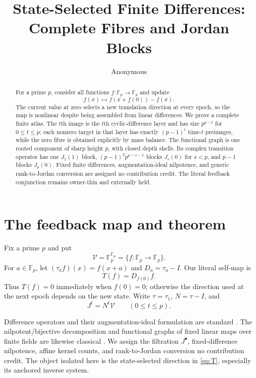 \documentclass[a4paper,10pt]{amsart}
\title[State-selected finite differences]{State-Selected Finite Differences:\\
Complete Fibres and Jordan Blocks}
\author{Anonymous}
\date{}
\theoremstyle{remark}
\newcommand{\F}{\mathbb F}
\newcommand{\cV}{\mathcal V}
\begin{document}
\begin{abstract}
For a prime $p$, consider all functions $f:\F_p\to\F_p$ and update
\[
             f(x)\longmapsto f(x+f(0))-f(x).
\]
The current value at zero selects a new translation direction at every
epoch, so the map is nonlinear despite being assembled from linear
differences.  We prove a complete finite atlas.  The $t$th image is the
$t$th cyclic-difference layer and has size $p^{p-t}$ for $0\le t\le p$;
each nonzero target in that layer has exactly $(p-1)^t$ time-$t$
preimages, while the zero fibre is obtained explicitly by mass balance.
The functional graph is one rooted component of sharp height $p$, with
closed depth shells.  Its complex transition operator has one
$J_1(1)$ block, $(p-1)^2p^{p-s-1}$ blocks $J_s(0)$ for $s<p$, and
$p-1$ blocks $J_p(0)$.  Fixed finite differences, augmentation-ideal
nilpotence, and generic rank-to-Jordan conversion are assigned no
contribution credit.  The literal feedback conjunction remains
owner-thin and externally held.
\end{abstract}

\maketitle

\section{The feedback map and theorem}

Fix a prime $p$ and put
\[
 \cV=\F_p^{\F_p}=\{f:\F_p\to\F_p\}.
\]
For $a\in\F_p$, let $(\tau_a f)(x)=f(x+a)$ and
$D_a=\tau_a-I$.  Our literal self-map is
\begin{equation}\label{eq:T}
                  T(f)=D_{f(0)}f.
\end{equation}
Thus $T(f)=0$ immediately when $f(0)=0$; otherwise the direction used at
the next epoch depends on the new state.  Write $\tau=\tau_1$,
$N=\tau-I$, and
\[
                     J^t=N^t\cV\qquad(0\le t\le p).
\]

Difference operators and their augmentation-ideal formulation are standard
\cite{AichingerMoosbauer2021}.  The nilpotent/bijective decomposition and
functional graphs of fixed linear maps over finite fields are likewise
classical \cite{HernandezToledo2005}.  We assign the filtration $J^\bullet$,
fixed-difference nilpotence, affine kernel counts, and rank-to-Jordan
conversion no contribution credit.  The object isolated here is the
state-selected direction in \eqref{eq:T}, especially its anchored inverse
system.
\end{document}
